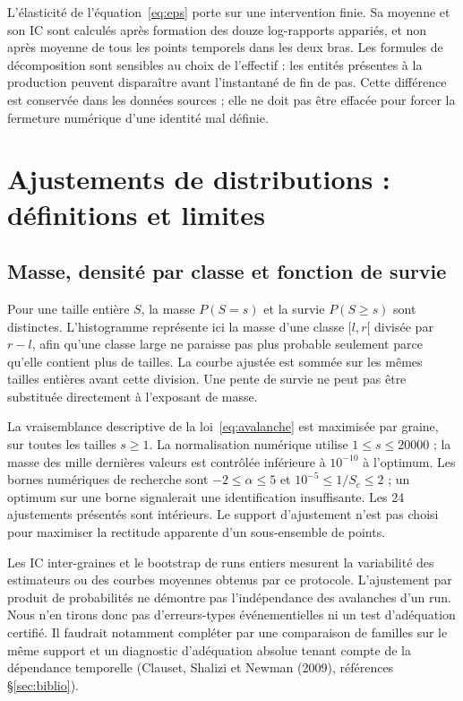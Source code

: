 L'élasticité de l'équation~\eqref{eq:eps} porte sur une intervention
finie. Sa moyenne et son IC sont calculés après formation des douze
log-rapports appariés, et non après moyenne de tous les points temporels
dans les deux bras. Les formules de décomposition sont sensibles au
choix de l'effectif : les entités présentes à la production peuvent
disparaître avant l'instantané de fin de pas. Cette différence est
conservée dans les données sources ; elle ne doit pas être effacée pour
forcer la fermeture numérique d'une identité mal définie.

\section{Ajustements de distributions : définitions et limites}\label{sec:ajustements}
\subsection{Masse, densité par classe et fonction de survie}
Pour une taille entière $S$, la masse $P(S=s)$ et la survie
$P(S\ge s)$ sont distinctes. L'histogramme représente ici la masse
d'une classe $[l,r[$ divisée par $r-l$, afin qu'une classe large ne
paraisse pas plus probable seulement parce qu'elle contient plus
de tailles. La courbe ajustée est sommée sur les mêmes tailles
entières avant cette division. Une pente de survie ne peut pas être
substituée directement à l'exposant de masse.

La vraisemblance descriptive de la loi~\eqref{eq:avalanche} est maximisée
par graine, sur toutes les tailles $s\ge1$. La normalisation numérique
utilise $1\le s\le20000$ ; la masse des mille dernières valeurs est
contrôlée inférieure à $10^{-10}$ à l'optimum. Les bornes numériques
de recherche sont $-2\le\alpha\le5$ et
$10^{-5}\le1/S_c\le2$ ; un optimum sur une borne signalerait une
identification insuffisante. Les 24 ajustements présentés sont intérieurs.
Le support d'ajustement n'est pas choisi pour maximiser la rectitude
apparente d'un sous-ensemble de points.

Les IC inter-graines et le bootstrap de runs entiers mesurent la
variabilité des estimateurs ou des courbes moyennes obtenus par ce
protocole. L'ajustement par produit de probabilités ne démontre pas
l'indépendance des avalanches d'un run. Nous n'en tirons donc pas
d'erreurs-types événementielles ni un test d'adéquation certifié.
Il faudrait notamment compléter par une comparaison de familles sur
le même support et un diagnostic d'adéquation absolue tenant compte
de la dépendance temporelle (Clauset, Shalizi et Newman (2009), références §\ref{sec:biblio}).

